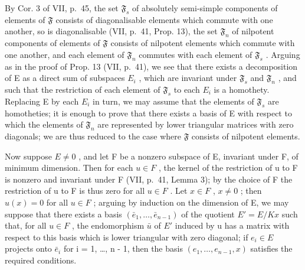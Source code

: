 By Cor. 3 of VII, p.~45, the set \(\mathfrak{F}_s\) of absolutely semi-simple components of elements of \(\mathfrak{F}\) consists of diagonalisable elements which commute with one another, so is diagonalisable (VII, p.~41, Prop. 13), the set \(\mathfrak{F}_n\) of nilpotent components of elements of \(\mathfrak{F}\) consists of nilpotent elements which commute with one another, and each element of \(\mathfrak{F}_n\) commutes with each element of \(\mathfrak{F}_s\) . Arguing as in the proof of Prop. 13 (VII, p.~41), we see that there exists a decomposition of E as a direct sum of subspaces \(E_i\) , which are invariant under \(\mathfrak{F}_s\) and \(\mathfrak{F}_n\) , and such that the restriction of each element of \(\mathfrak{F}_s\) to each \(E_i\) is a homothety. Replacing E by each \(E_i\) in turn, we may assume that the elements of \(\mathfrak{F}_s\) are homotheties; it is enough to prove that there exists a basis of E with respect to which the elements of \(\mathfrak{F}_n\) are represented by lower triangular matrices with zero diagonals; we are thus reduced to the case where \(\mathfrak{F}\) consists of nilpotent elements.

Now suppose \(E \neq 0\) , and let F be a nonzero subspace of E, invariant under F, of minimum dimension. Then for each \(u \in F\) , the kernel of the restriction of u to F is nonzero and invariant under F (VII, p.~41, Lemma 3); by the choice of F the restriction of u to F is thus zero for all \(u \in F\) . Let \(x \in F\) , \(x \neq 0\) ; then \(u(x) = 0\) for all \(u \in F\) ; arguing by induction on the dimension of E, we may suppose that there exists a basis \((\bar{e}_{1}, \ldots, \bar{e}_{n-1})\) of the quotient \(E' = E/Kx\) such that, for all \(u \in F\) , the endomorphism \(\bar{u}\) of \(E'\) induced by u has a matrix with respect to this basis which is lower triangular with zero diagonal; if \(e_{i} \in E\) projects onto \(\bar{e}_{i}\) for i = 1, \ldots, n - 1, then the basis \((e_{1}, \ldots, e_{n-1}, x)\) satisfies the required conditions.


